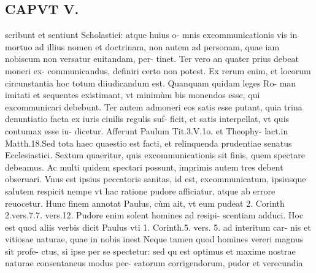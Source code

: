 \documentclass{article}
\begin{document}
\begin{pages}
\section*{CAPVT  V. }
\marginpar{[ p.399 ]}\pstart scribunt et sentiunt Scholastici: atque huius o- mnis excommunicationis vis in mortuo ad illius nomen et doctrinam, non autem ad personam, quae iam nobiscum non versatur euitandam, per- tinet.  \pend\pstart Ter vero an quater prius debeat moneri ex- communicandus, definiri certo non potest. Ex rerum enim, et locorum circunstantia hoc totum diiudicandum est. Quanquam quidam leges Ro- man imitati et sequentes existimant, vt minimùm bis monendos esse, qui excommunicari debebunt. Ter autem admoneri eos satis esse putant, quia trina denuntiatio facta ex iuris ciuilis regulis suf- ficit, et satis interpellat, vt quis contumax esse iu- dicetur. Afferunt Paulum Tit.3.V.1o. et Theophy- lact.in Matth.18.Sed tota haec quaestio est facti, et relinquenda prudentiae senatus Ecclesiastici.  \pend\pstart Sextum quaeritur, quis excommunicationis sit finis, quem spectare debeamus. Ac multi quidem spectari possunt, imprimis autem tres debent obseruari. Vnus est ipsius peccatoris sanitas, id est, excommunicatum, ipsiusque salutem respicit nempe vt hac ratione pudore afficiatur, atque  ab errore reuocetur. Hunc finem annotat Paulus, cùm ait, vt eum pudeat 2. Corinth 2.vers.7.7. vers.12. Pudore enim solent homines ad resipi- scentiam adduci. Hoc est quod aliis verbis dicit Paulus vti 1. Corinth.5. vers. 5. ad interitum car- nis et vitiosae naturae, quae in nobis inest Neque tamen quod homines vereri magnus sit profe- ctus, si ipse per se spectetur: sed qu est optimus et maxime nostrae naturae consentaneus modus pec- catorum corrigendorum, pudor et verecundia  \pend

\end{pages}
\end{document}
